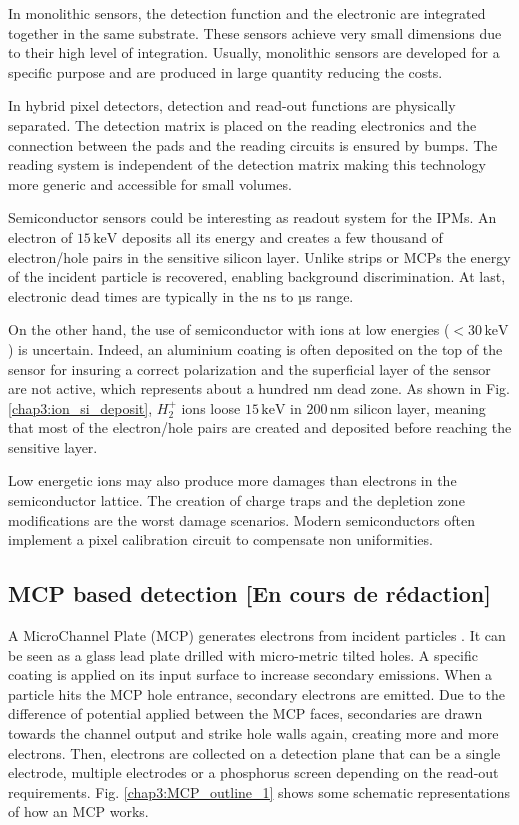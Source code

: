 \begin{refsection}
  In monolithic sensors, the detection function and the electronic are integrated together in the same substrate. These sensors achieve very small dimensions due to their high level of integration. Usually, monolithic sensors are developed for a specific purpose and are produced in large quantity reducing the costs.

  In hybrid pixel detectors, detection and read-out functions are physically separated. The detection matrix is ​​placed on the reading electronics and the connection between the pads and the reading circuits is ensured by bumps. The reading system is independent of the detection matrix making this technology more generic and accessible for small volumes.

  Semiconductor sensors could be interesting as readout system for the IPMs. An electron of $15\,\mathrm{keV}$ deposits all its energy and creates a few thousand of electron/hole pairs in the sensitive silicon layer. Unlike strips or MCPs the energy of the incident particle is recovered, enabling background discrimination. At last, electronic dead times are typically in the ns to µs range.

  On the other hand, the use of semiconductor with ions at low energies ($< 30 \,\mathrm{keV}$) is uncertain. Indeed, an aluminium coating is often deposited on the top of the sensor for insuring a correct polarization and the superficial layer of the sensor are not active, which represents about a hundred nm dead zone. As shown in Fig. \ref{chap3:ion_si_deposit}, $H_{2}^{+}$ ions loose $15\,\mathrm{keV}$ in $200\,\mathrm{nm}$ silicon layer, meaning that most of the electron/hole pairs are created and deposited before reaching the sensitive layer.

  Low energetic ions may also produce more damages than electrons in the semiconductor lattice. The creation of charge traps and the depletion zone modifications are the worst damage scenarios. Modern semiconductors often implement a pixel calibration circuit to compensate non uniformities.

  \subsection{MCP based detection  [En cours de rédaction]}

  A MicroChannel Plate (MCP) generates electrons from incident particles \cite{Wiza1979}.
  It can be seen as a glass lead plate drilled with micro-metric tilted holes.
  A specific coating is applied on its input surface to increase secondary emissions. When a particle hits the MCP hole entrance, secondary electrons are emitted. Due to the difference of potential applied between the MCP faces, secondaries are drawn towards the channel output and strike hole walls again, creating more and more electrons. Then, electrons are collected on a detection plane that can be a single electrode, multiple electrodes or a phosphorus screen depending on the read-out requirements. Fig. \ref{chap3:MCP_outline_1} shows some schematic representations of how an MCP works.


\end{refsection}
